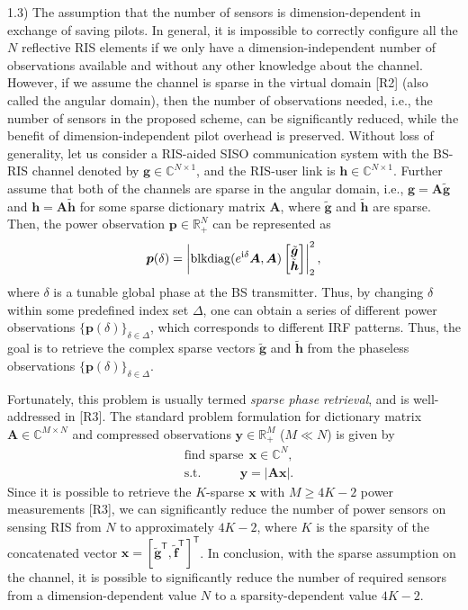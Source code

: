 \documentclass[a4paper,12pt]{article}
\def \T {^{\mathsf{T}}}
\def \ri {{\rm i}}
\begin{document}
{{1.3) The assumption that the number of sensors is dimension-dependent in exchange of saving pilots. In general, it is impossible to correctly configure all the $N$ reflective RIS elements if we only have a dimension-independent number of observations available and without any other knowledge about the channel. However, if we assume the channel is sparse in the virtual domain [R2] (also called the angular domain), then the number of observations needed, i.e., the number of sensors in the proposed scheme, can be significantly reduced, while the benefit of dimension-independent pilot overhead is preserved. Without loss of generality, let us consider a RIS-aided SISO communication system with the BS-RIS channel denoted by ${\bm g}\in\mathbb{C}^{N\times 1}$, and the RIS-user link is ${\bm h}\in\mathbb{C}^{N\times 1}$. Further assume that both of the channels are sparse in the angular domain, i.e., ${\bm g} = {\bm A}\tilde{\bm g}$ and ${\bm h} = {\bm A}\tilde{\bm h}$ for some sparse dictionary matrix ${\bm A}$, where $\tilde{\bm g}$ and $\tilde{\bm h}$ are sparse. Then, the power observation ${\bm p}\in\mathbb{R}_{+}^N$ can be represented as 
\begin{equation}
    {\bm p}(\delta) = \left|{\rm blkdiag}(e^{\ri \delta}{\bm A}, {\bm A}) \begin{bmatrix} \tilde{\bm g} \\ \tilde{\bm h}\end{bmatrix} \right|_2^2,
\end{equation}
where $\delta$ is a tunable global phase at the BS transmitter. Thus, by changing $\delta$ within some predefined index set $\Delta$, one can obtain a series of different power observations $\{{\bm p}(\delta)\}_{\delta\in\Delta}$, which corresponds to different IRF patterns. 
Thus, the goal is to retrieve the complex sparse vectors $\tilde{\bm g}$ and $\tilde{\bm h}$ from the phaseless observations $\{{\bm p}(\delta)\}_{\delta\in\Delta}$. 

Fortunately, this problem is usually termed {\it sparse phase retrieval}, and is well-addressed in [R3]. The standard problem formulation for dictionary matrix ${\bm A}\in\mathbb{C}^{M\times N}$ and compressed observations ${\bm y}\in\mathbb{R}_{+}^{M}$ ($M\ll N$) is given by  
\begin{equation}
    \begin{aligned}
        &{\text{find sparse}}~~{\bm x\in\mathbb{C}^N},\\
        &{\text{s.t.}}~~~~~~~~~~~~~~{\bm y} = \left|{\bm A}{\bm x}\right|.
    \end{aligned}
\end{equation}
Since it is possible to retrieve the $K$-sparse ${\bm x}$ with $M\geq 4K-2$ power measurements [R3], we can significantly reduce the number of power sensors on sensing RIS from $N$ to approximately $4K-2$, where $K$ is the sparsity of the concatenated vector ${\bm x} = [\tilde{\bm g}\T, \tilde{\bm f}\T]\T$. In conclusion, with the sparse assumption on the channel, it is possible to significantly reduce the number of required sensors from a dimension-dependent value $N$ to a sparsity-dependent value $4K-2$. 

}}
\end{document}
